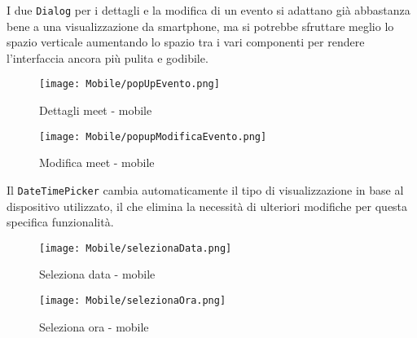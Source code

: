 \clearpage
\noindent I due \texttt{Dialog} per i dettagli e la modifica di un evento si adattano già abbastanza bene a una 
visualizzazione da smartphone, ma si potrebbe sfruttare meglio lo spazio verticale aumentando lo spazio tra i vari 
componenti per rendere l'interfaccia ancora più pulita e godibile. 
\begin{figure}[H]
    \centering
    \begin{minipage}{0.45\textwidth}
        \centering
        \texttt{[image: Mobile/popUpEvento.png]}
        \caption{Dettagli meet - mobile}
    \end{minipage}
    \hspace{0.05\textwidth}
    \begin{minipage}{0.45\textwidth}
        \centering
        \texttt{[image: Mobile/popupModificaEvento.png]}
        \caption{Modifica meet - mobile}
    \end{minipage}
\end{figure}
\clearpage
\noindent Il \texttt{DateTimePicker} cambia automaticamente il tipo di visualizzazione in base al dispositivo utilizzato, 
il che elimina la necessità di ulteriori modifiche per questa specifica funzionalità. 
\begin{figure}[H]
    \centering
    \begin{minipage}{0.45\textwidth}
        \centering
        \texttt{[image: Mobile/selezionaData.png]}
        \caption{Seleziona data - mobile}
    \end{minipage}
    \hspace{0.05\textwidth}
    \begin{minipage}{0.45\textwidth}
        \centering
        \texttt{[image: Mobile/selezionaOra.png]}
        \caption{Seleziona ora - mobile}
    \end{minipage}
\end{figure}